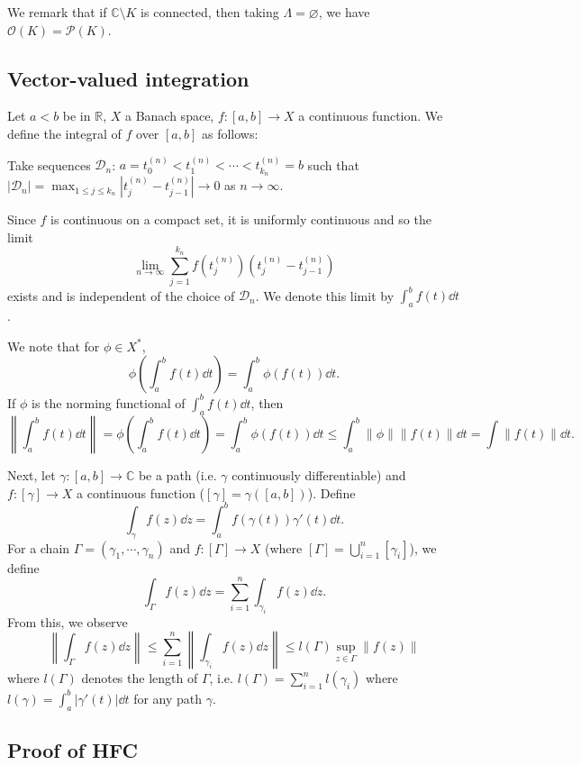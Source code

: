 \documentclass[]{article}
\theoremstyle{definition}
\begin{document}
We remark that if \(\mathbb{C} \setminus K\) is connected, then taking \(\Lambda = \varnothing\), we 
have \(\mathcal{O}(K) = \mathcal{P}(K)\).

\subsection{Vector-valued integration}

Let \(a < b\) be in \(\mathbb{R}\), \(X\) a Banach space, \(f : [a, b] \to X\) a continuous function.
We define the integral of \(f\) over \([a, b]\) as follows:

Take sequences \(\mathcal{D}_n\): \(a = t_0^{(n)} < t_1^{(n)} < \cdots < t_{k_n}^{(n)} = b\)
such that \(|\mathcal{D}_n| =  \max_{1 \le j \le k_n} |t_j^{(n)} - t_{j - 1}^{(n)}| \to 0\) as 
\(n \to \infty\).

Since \(f\) is continuous on a compact set, it is uniformly continuous and so the limit 
\[\lim_{n \to \infty} \sum_{j = 1}^{k_n}f(t_j^{(n)})(t_j^{(n)} - t_{j - 1}^{(n)})\]
exists and is independent of the choice of \(\mathcal{D}_n\). We denote this limit by 
\(\int_a^b f(t) \dd t\).

We note that for \(\phi \in X^*\), 
\[\phi\left(\int_a^b f(t) \dd t\right) = \int_a^b \phi(f(t)) \dd t.\]
If \(\phi\) is the norming functional of \(\int_a^b f(t) \dd t\), then 
\[\left\|\int_a^b f(t) \dd t\right\| = \phi\left(\int_a^b f(t) \dd t\right) = 
  \int_a^b \phi(f(t)) \dd t \le \int_a^b \|\phi\|\|f(t)\| \dd t = \int \|f(t)\| \dd t.\]

Next, let \(\gamma : [a, b] \to \mathbb{C}\) be a path (i.e. \(\gamma\) continuously differentiable) 
and \(f : [\gamma] \to X\) a continuous function (\([\gamma] = \gamma([a, b])\)). Define 
\[\int_\gamma f(z) \dd z = \int_a^b f(\gamma(t)) \gamma'(t) \dd t.\]
For a chain \(\Gamma = (\gamma_1, \cdots, \gamma_n)\) and \(f : [\Gamma] \to X\) (where 
\([\Gamma] = \bigcup_{i = 1}^n [\gamma_i]\)), we define 
\[\int_\Gamma f(z) \dd z = \sum_{i = 1}^n \int_{\gamma_i} f(z) \dd z.\]
From this, we observe 
\[\left\|\int_\Gamma f(z) \dd z \right\| \le \sum_{i = 1}^n \left\|\int_{\gamma_i} f(z) \dd z\right\|
  \le l(\Gamma) \sup_{z \in \Gamma} \|f(z)\|\]
where \(l(\Gamma)\) denotes the length of \(\Gamma\), i.e. \(l(\Gamma) = \sum_{i = 1}^n l(\gamma_i)\)
where \(l(\gamma) = \int_a^b |\gamma'(t)| \dd t\) for any path \(\gamma\).

\subsection{Proof of HFC}
\end{document}
